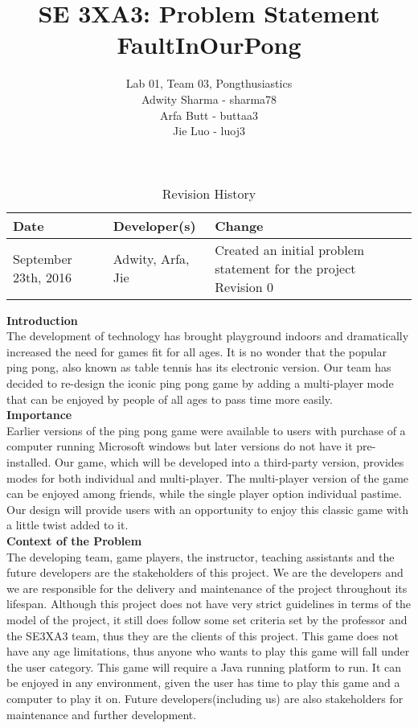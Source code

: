 \documentclass{article}
\title{SE 3XA3: Problem Statement\\FaultInOurPong}
\author{Lab 01, Team 03, Pongthusiastics
		\\ Adwity Sharma - sharma78
		\\ Arfa Butt - buttaa3
		\\ Jie Luo - luoj3
}
\date{}
\begin{document}
\begin{table}[hp]
\caption{Revision History} \label{TblRevisionHistory}
\begin{tabularx}{\textwidth}{llX}
\toprule
\textbf{Date} & \textbf{Developer(s)} & \textbf{Change}\\
\midrule
September 23th, 2016 & Adwity, Arfa, Jie & Created an initial problem statement for the project Revision 0\\
\bottomrule
\end{tabularx}
\end{table}

\newpage

\maketitle

\noindent\textbf{Introduction}\\

The development of technology has brought playground indoors and dramatically increased the need for games fit for all ages. It is no wonder that the popular ping pong, also known as table tennis has its electronic version. Our team has decided to re-design the iconic ping pong game by adding a multi-player mode that can be enjoyed by people of all ages to pass time more easily. \\

\noindent\textbf{Importance}\\

Earlier versions of the ping pong game were available to users with purchase of a computer running Microsoft windows but later versions do not have it pre-installed. Our game, which will be developed into a third-party version, provides modes for both individual and multi-player. The multi-player version of the game can be enjoyed among friends, while the single player option individual pastime. Our design will provide users with an opportunity to enjoy this classic game with a little twist added to it. \\

\noindent\textbf{Context of the Problem}\\

The developing team, game players, the instructor, teaching assistants and the future developers are the stakeholders of this project. We are the developers and we are responsible for the delivery and maintenance of the project throughout its lifespan. Although this project does not have very strict guidelines in terms of the model of the project, it still does follow some set criteria set by the professor and the SE3XA3 team, thus they are the clients of this project. This game does not have any age limitations, thus anyone who wants to play this game will fall under the user category. This game will require a Java running platform to run. It can be enjoyed in any environment, given the user has time to play this game and a computer to play it on. Future developers(including us) are also stakeholders for maintenance and further development.
\end{document}
